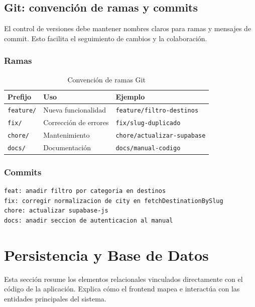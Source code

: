 \documentclass[12pt,letterpaper]{article}
\newcommand{\code}[1]{\nolinkurl{#1}}
\begin{document}
\subsection{Git: convención de ramas y commits}

El control de versiones debe mantener nombres claros para ramas y mensajes de commit. Esto facilita el seguimiento de cambios y la colaboración.

\subsubsection*{Ramas}

\begin{longtable}{|p{}|p{}|p{}|}
\caption{Convención de ramas Git}\\
\hline
\textbf{Prefijo} & \textbf{Uso} & \textbf{Ejemplo} \\
\hline
\code{feature/} & Nueva funcionalidad & \code{feature/filtro-destinos} \\
\hline
\code{fix/} & Corrección de errores & \code{fix/slug-duplicado} \\
\hline
\code{chore/} & Mantenimiento & \code{chore/actualizar-supabase} \\
\hline
\code{docs/} & Documentación & \code{docs/manual-codigo} \\
\hline
\end{longtable}

\subsubsection*{Commits}

\begin{lstlisting}[language={}]
feat: anadir filtro por categoria en destinos
fix: corregir normalizacion de city en fetchDestinationBySlug
chore: actualizar supabase-js
docs: anadir seccion de autenticacion al manual
\end{lstlisting}

\section{Persistencia y Base de Datos}

Esta sección resume los elementos relacionales vinculados directamente con el código de la aplicación. Explica cómo el frontend mapea e interactúa con las entidades principales del sistema.
\end{document}
